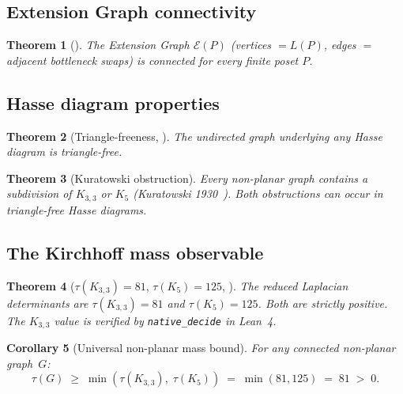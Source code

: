 \documentclass[11pt]{article}
\newtheorem{theorem}{Theorem}[section]
\newtheorem{corollary}[theorem]{Corollary}
\newcommand{\Kthree}{K_{3,3}}
\begin{document}
\subsection{Extension Graph connectivity}

\begin{theorem}[{\cite[ExtGraph.lean]{SilvaAlvarado26}}]
\label{thm:ext-connected}
The Extension Graph $\mathcal{E}(P)$ (vertices $= L(P)$,
edges $=$ adjacent bottleneck swaps) is connected for every
finite poset $P$.
\end{theorem}

\subsection{Hasse diagram properties}

\begin{theorem}[Triangle-freeness, {\cite[HasseDAG.lean]{SilvaAlvarado26}}]
\label{thm:triangle-free}
The undirected graph underlying any Hasse diagram is
triangle-free.
\end{theorem}

\begin{theorem}[Kuratowski obstruction]
\label{thm:kuratowski}
Every non-planar graph contains a subdivision of $\Kthree$
or $K_5$ (Kuratowski 1930~\cite{Kuratowski30}).  Both
obstructions can occur in triangle-free Hasse diagrams.
\end{theorem}

\subsection{The Kirchhoff mass observable}

\begin{theorem}[$\tau(\Kthree) = 81$, $\tau(K_5) = 125$,
{\cite[K33.lean]{SilvaAlvarado26}}]
\label{thm:tau81}
The reduced Laplacian determinants are $\tau(\Kthree) = 81$
and $\tau(K_5) = 125$.  Both are strictly positive.
The $\Kthree$ value is verified by \texttt{native\_decide}
in Lean~4.
\end{theorem}

\begin{corollary}[Universal non-planar mass bound]
\label{cor:tau-bound}
For any connected non-planar graph~$G$:
\[
  \tau(G) \;\ge\; \min(\tau(\Kthree),\; \tau(K_5))
  \;=\; \min(81, 125) \;=\; 81 \;>\; 0.
\]
\end{corollary}
\end{document}
